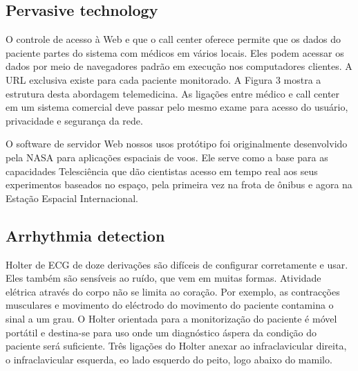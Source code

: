 \documentclass[12pt]{article} %
\begin{document}

\subsection{Pervasive technology} %

O controle de acesso à Web e que o call center oferece permite que os dados do paciente partes do sistema com médicos em vários locais. Eles podem acessar os dados por meio de navegadores padrão em execução nos computadores clientes. A URL exclusiva existe para cada paciente monitorado. A Figura 3 mostra a estrutura desta abordagem telemedicina. As ligações entre médico e call center em um sistema comercial deve passar pelo mesmo exame para acesso do usuário, privacidade e segurança da rede.

O software de servidor Web nossos usos protótipo foi originalmente desenvolvido pela NASA para aplicações espaciais de voos. Ele serve como a base para as capacidades Telesciência que dão cientistas acesso em tempo real aos seus experimentos baseados no espaço, pela primeira vez na frota de ônibus e agora na Estação Espacial Internacional.


\subsection{Arrhythmia detection} %

Holter de ECG de doze derivações são difíceis de configurar corretamente e usar. Eles também são sensíveis ao ruído, que vem em muitas formas. Atividade elétrica através do corpo não se limita ao coração. Por exemplo, as contracções musculares e movimento do eléctrodo do movimento do paciente contamina o sinal a um grau. O Holter orientada para a monitorização do paciente é móvel portátil e destina-se para uso onde um diagnóstico áspera da condição do paciente será suficiente. Três ligações do Holter anexar ao infraclavicular direita, o infraclavicular esquerda, eo lado esquerdo do peito, logo abaixo do mamilo.
\end{document}
